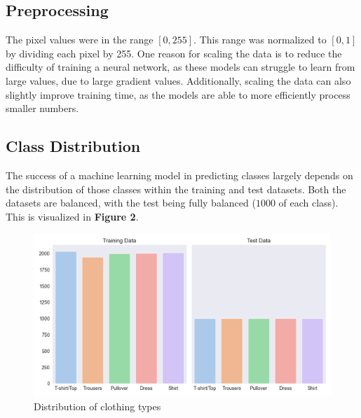 \subsection{Preprocessing}\label{subsec:preprocessing}
The pixel values were in the range $[0, 255]$.
This range was normalized to $[0, 1]$ by dividing each pixel by 255.
One reason for scaling the data is to reduce the difficulty of training a neural network, as these models can struggle to learn from large values, due to large gradient values. %
Additionally, scaling the data can also slightly improve training time, as the models are able to more efficiently process smaller numbers.
\subsection{Class Distribution}\label{subsec:class-distribution}
The success of a machine learning model in predicting classes largely depends on the distribution of those classes within the training and test datasets.
Both the datasets are balanced, with the test being fully balanced ($1000$ of each class).
This is visualized in \textbf{Figure 2}.
\begin{figure}[ht]
\centering
\includegraphics[scale=0.45]{figures_for_report/class_distribution}
\captionsetup{justification=centering,margin=2cm}
\caption{Distribution of clothing types}\label{fig:figure2}
\end{figure}

